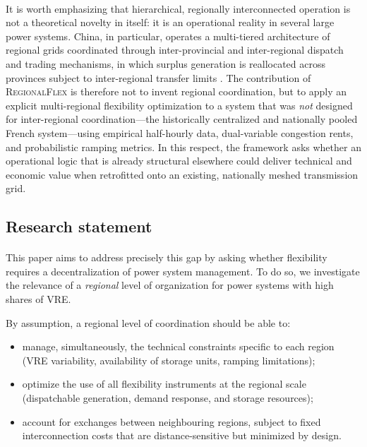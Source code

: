 \documentclass[12pt]{article}
\begin{document}
\paragraph{}
It is worth emphasizing that hierarchical, regionally interconnected operation is not a theoretical novelty in itself: it is an operational reality in several large power systems. China, in particular, operates a multi-tiered architecture of regional grids coordinated through inter-provincial and inter-regional dispatch and trading mechanisms, in which surplus generation is reallocated across provinces subject to inter-regional transfer limits \citep{china_interprovincial,china_regional_dispatch}. The contribution of \textsc{RegionalFlex} is therefore not to invent regional coordination, but to apply an explicit multi-regional flexibility optimization to a system that was \emph{not} designed for inter-regional coordination---the historically centralized and nationally pooled French system---using empirical half-hourly data, dual-variable congestion rents, and probabilistic ramping metrics. In this respect, the framework asks whether an operational logic that is already structural elsewhere could deliver technical and economic value when retrofitted onto an existing, nationally meshed transmission grid.

\subsection{Research statement}

\paragraph{}
This paper aims to address precisely this gap by asking whether flexibility requires a decentralization of power system management. To do so, we investigate the relevance of a \emph{regional} level of organization for power systems with high shares of VRE.

By assumption, a regional level of coordination should be able to:
\begin{itemize}
  \item manage, simultaneously, the technical constraints specific to each region (VRE variability, availability of storage units, ramping limitations);
  \item optimize the use of all flexibility instruments at the regional scale (dispatchable generation, demand response, and storage resources);
  \item account for exchanges between neighbouring regions, subject to fixed interconnection costs that are distance-sensitive but minimized by design.
\end{itemize}
\end{document}
